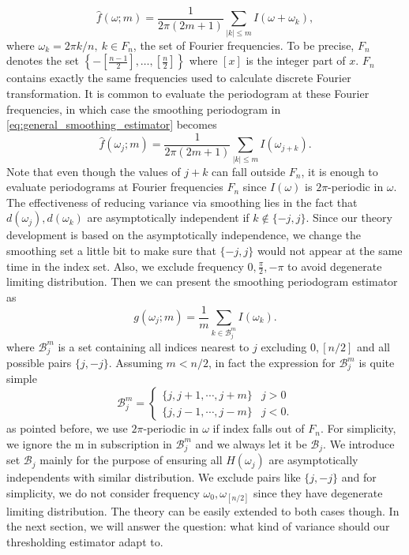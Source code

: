 \begin{equation}
\label{eq:general_smoothing_estimator}
    \hat{f}(\omega; m) = \frac{1}{2\pi(2m+1)} \sum_{|k|\le m} I(\omega+\omega_k),
\end{equation}
where $\omega_k = 2\pi k/n, ~ k\in F_n$,  the set of Fourier frequencies. To be precise, $F_n$ denotes the set  $\left\{-[\frac{n-1}{2}], \dots, [\frac{n}{2}]\right\}$ where $[x]$ is the integer part of $x$. $F_n$ contains exactly the same frequencies used to calculate discrete Fourier transformation. It is common to evaluate the periodogram at these Fourier frequencies, in which case the smoothing periodogram in \eqref{eq:general_smoothing_estimator} becomes
\begin{equation}
\label{eq:smoothing estimator}
    \hat{f}(\omega_j; m) = \frac{1}{2\pi(2m+1)} \sum_{|k|\le m} I(\omega_{j+k}).
\end{equation}
Note that even though the values of $j+k$ can fall outside $F_n$, it is enough to evaluate periodograms at Fourier frequencies $F_n$ since $I(\omega)$ is $2\pi$-periodic in $\omega$. The effectiveness of reducing variance via smoothing lies in the fact that $d(\omega_j), d(\omega_k)$ are asymptotically independent if $k\notin \{-j, j\}$. Since our theory development is based on the asymptotically independence, we change the smoothing set a little bit to make sure that $\{-j, j\}$ would not appear at the same time in the index set. Also, we exclude frequency $0, \frac{\pi}{2}, -\pi$ to avoid degenerate limiting distribution. Then we can present the smoothing periodogram estimator as 
\begin{equation}
g(\omega_j; m) = \frac{1}{m}\sum_{ k\in \mathcal{B}_j^m} I(\omega_k). 
\end{equation}
where $\mathcal{B}_j^m$ is a set containing all indices nearest to $j$ excluding $0, [n/2]$ and all possible pairs $\{j, -j\}$. Assuming $m<n/2$,
in fact the expression for $\mathcal{B}_j^m$ is quite simple
\begin{equation}
\label{eq:def_neb}
\mathcal{B}_j^m = 
\begin{cases}
\{j, j+1, \cdots, j+m\}& j>0 \\
\{j, j-1, \cdots, j-m\}& j<0.
\end{cases}
\end{equation}
as pointed before, we use $2\pi$-periodic in $\omega$ if index falls out of $F_n$. For simplicity, we ignore the m in subscription in $\mathcal{B}_j^m$ and we always let it be $\mathcal{B}_j$. We introduce set $\mathcal{B}_j$ mainly for the purpose of ensuring all $H(\omega_j)$ are asymptotically independents with similar distribution. We exclude pairs like $\{j, -j \}$ and for simplicity, we do not consider frequency $\omega_0, \omega_{[n/2]}$ since they have degenerate limiting distribution. The theory can be easily extended to both cases though. In the next section, we will answer the question: what kind of variance should our thresholding estimator adapt to. \par 


